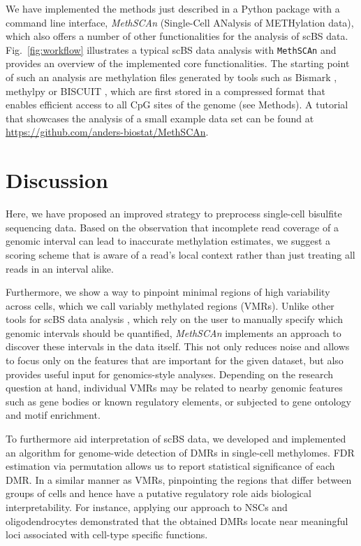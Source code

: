 \documentclass[10pt]{article}
\begin{document}
We have implemented the methods just described in a Python package with a command line interface, \textit{MethSCAn} (Single-Cell ANalysis of METHylation data), which also offers a number of other functionalities for the analysis of scBS data. 
Fig.~\ref{fig:workflow} illustrates a typical scBS data analysis with \texttt{MethSCAn} and provides an overview of the implemented core functionalities.
The starting point of such an analysis are methylation files generated by tools such as Bismark \citep{bismark}, methylpy \citep{methylpy} or BISCUIT \citep{biscuit}, which are first stored in a compressed format that enables efficient access to all CpG sites of the genome (see Methods).
A tutorial that showcases the analysis of a small example data set can be found at \url{https://github.com/anders-biostat/MethSCAn}.


\section*{Discussion}

Here, we have proposed an improved strategy to preprocess single-cell bisulfite sequencing data.
Based on the observation that incomplete read coverage of a genomic interval can lead to inaccurate methylation estimates, we suggest a scoring scheme that is aware of a read's local context rather than just treating all reads in an interval alike. 

Furthermore, we show a way to pinpoint minimal regions of high variability across cells, which we call variably methylated regions (VMRs).
Unlike other tools for scBS data analysis \citep{kapourani2019melissa, kapourani2021scmet, danese2021episcanpy}, which rely on the user to manually specify which genomic intervals should be quantified, \textit{MethSCAn} implements an approach to discover these intervals in the data itself. This not only reduces noise and allows to focus only on the features that are important for the given dataset, but also provides useful input for genomics-style analyses.
Depending on the research question at hand, individual VMRs may be related to nearby genomic features such as gene bodies or known regulatory elements, or subjected to gene ontology and motif enrichment.

To furthermore aid interpretation of scBS data, we developed and implemented an algorithm for genome-wide detection of DMRs in single-cell methylomes.
FDR estimation via permutation allows us to report statistical significance of each DMR.
In a similar manner as VMRs, pinpointing the regions that differ between groups of cells and hence have a putative regulatory role aids biological interpretability.
For instance, applying our approach to NSCs and oligodendrocytes demonstrated that the obtained DMRs locate near meaningful loci associated with cell-type specific functions.
\end{document}
